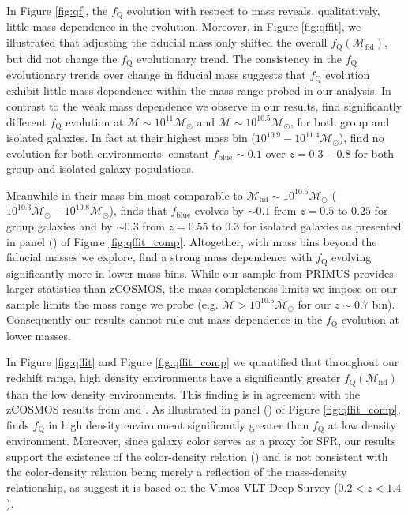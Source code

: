 In Figure \ref{fig:qf}, the $f_{\mathrm{Q}}$ evolution with respect to
mass reveals, qualitatively, little mass dependence in the
evolution. Moreover, in Figure \ref{fig:qffit}, we illustrated that
adjusting the fiducial mass only shifted the overall
$f_{\mathrm{Q}}(\mathcal{M}_{\mathrm{fid}})$, but did not change the
$f_{\mathrm{Q}}$ evolutionary trend. The consistency in the $f_{\mathrm{Q}}$
evolutionary trends over change in fiducial mass suggests that
$f_{\mathrm{Q}}$ evolution exhibit little mass dependence within the 
mass range probed in our analysis. In contrast to
the weak mass dependence we observe in our results,
\cite{Iovino:2010aa} find significantly different $f_{\mathrm{Q}}$
evolution at $\mathcal{M} \sim 10^{11} \mathcal{M}_{\odot}$ and
$\mathcal{M} \sim 10^{10.5} \mathcal{M}_{\odot}$, for both group and
isolated galaxies. In fact at their highest mass bin ($10^{10.9} -
10^{11.4} \mathcal{M}_{\odot}$), \cite{Iovino:2010aa} find no evolution
for both environments: constant $f_{\mathrm{blue}} \sim 0.1$ over $z =
0.3 - 0.8$ for both group and isolated galaxy populations.

Meanwhile in their mass bin most comparable to $\mathcal{M}_{\mathrm{fid}}
\sim 10^{10.5} \mathcal{M}_{\odot}$ ($10^{10.3} \mathcal{M}_{\odot} -
10^{10.8} \mathcal{M}_{\odot}$), \cite{Iovino:2010aa} finds that
$f_{\mathrm{blue}}$ evolves by $\sim 0.1$ from $z = 0.5$ to $0.25$ for
group galaxies and by $\sim 0.3$ from $z=0.55$ to $0.3$ for isolated
galaxies as presented in panel (\iovinopanel) of Figure \ref{fig:qffit_comp}. Altogether, with
mass bins beyond the fiducial masses we explore, \cite{Iovino:2010aa}
find a strong mass dependence with $f_{\mathrm{Q}}$ evolving significantly
more in lower mass bins. While our sample from PRIMUS provides larger
statistics than zCOSMOS, the mass-completeness limits we impose on our
sample limits the mass range we probe (e.g. $\mathcal{M} > 10^{10.5}
\mathcal{M}_{\odot}$ for our $z \sim 0.7$ bin). Consequently our
results cannot rule out mass dependence in the $f_{\mathrm{Q}}$ evolution
at lower masses.

In Figure \ref{fig:qffit} and Figure \ref{fig:qffit_comp} we
quantified that throughout our redshift range, high density
environments have a significantly greater
$f_{\mathrm{Q}}(\mathcal{M}_{\mathrm{fid}})$ than the low density
environments. This finding is in agreement with the zCOSMOS results
from \cite{Cucciati:2010aa} and \cite{Kovac:2014aa}. As illustrated in
panel (\kovacpanel) of Figure \ref{fig:qffit_comp}, \cite{Kovac:2014aa} finds $f_{\mathrm{Q}}$ in high density environment
significantly greater than $f_{\mathrm{Q}}$ at low density
environment. Moreover, since galaxy color serves as a proxy for SFR,
our results support the existence of the color-density relation
(\citealt{Cucciati:2010aa, Cooper:2010aa}) and is not consistent with
the color-density relation being merely a reflection of the
mass-density relationship, as \cite{Scodeggio:2009aa} suggest it is
based on the Vimos VLT Deep Survey ($0.2 < z< 1.4$).

